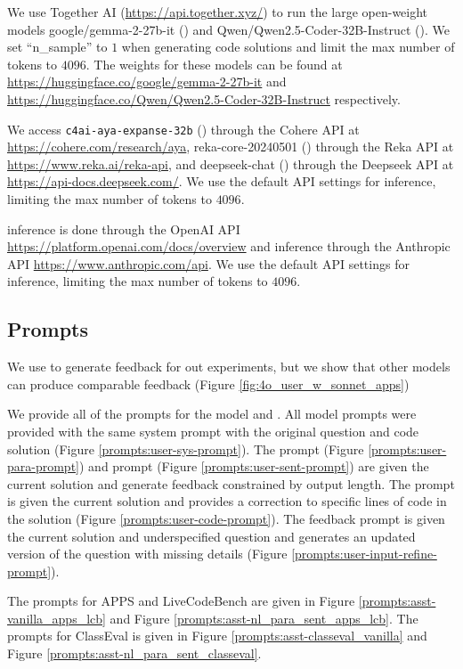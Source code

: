 We use Together AI (\url{https://api.together.xyz/}) to run the large open-weight models google/gemma-2-27b-it (\gemmaLarge{}) and Qwen/Qwen2.5-Coder-32B-Instruct (\qwenLarge{}). 
We set ``n\_sample'' to $1$ when generating code solutions and limit the max number of tokens to $4096$.
The weights for these models can be found at \url{https://huggingface.co/google/gemma-2-27b-it} and \url{https://huggingface.co/Qwen/Qwen2.5-Coder-32B-Instruct} respectively.

We access \texttt{c4ai-aya-expanse-32b} (\aya{}) through the Cohere API at \url{https://cohere.com/research/aya}, reka-core-20240501 (\reka{}) through the Reka API at \url{https://www.reka.ai/reka-api}, and deepseek-chat (\deepseek{}) through the Deepseek API at \url{https://api-docs.deepseek.com/}.  
We use the default API settings for inference, limiting the max number of tokens to $4096$.

\gpt{} inference is done through the OpenAI API \url{https://platform.openai.com/docs/overview} and \sonnet{} inference through the Anthropic API \url{https://www.anthropic.com/api}.
We use the default API settings for inference, limiting the max number of tokens to $4096$.


\subsection{Prompts}\label{app:prompts}
We use \sonnet{} to generate \user{} feedback for out experiments, but we show that other models can produce comparable feedback (Figure \ref{fig:4o_user_w_sonnet_apps})

We provide all of the prompts for the \user{} model and \cm{}. 
All \user{} model prompts were provided with the same system prompt with the original question and code solution (Figure \ref{prompts:user-sys-prompt}). 
The \para{} prompt (Figure \ref{prompts:user-para-prompt}) and \sent{} prompt (Figure \ref{prompts:user-sent-prompt}) are given the current \cm{} solution and generate feedback constrained by output length. 
The \cf{} prompt is given the current \cm{} solution and provides a correction to specific lines of code in the solution (Figure \ref{prompts:user-code-prompt}). 
The \ir{} feedback prompt is given the current \cm{} solution and underspecified question and generates an updated version of the question with missing details (Figure \ref{prompts:user-input-refine-prompt}).

The \cm{} prompts for APPS and LiveCodeBench are given in Figure \ref{prompts:asst-vanilla_apps_lcb} and Figure \ref{prompts:asst-nl_para_sent_apps_lcb}.
The \cm{} prompts for ClassEval is given in Figure \ref{prompts:asst-classeval_vanilla} and Figure \ref{prompts:asst-nl_para_sent_classeval}.

